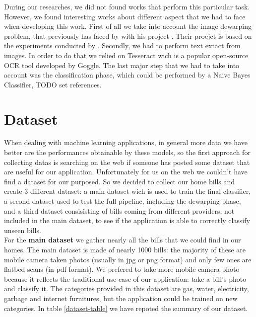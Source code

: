 \documentclass[10pt,twocolumn,letterpaper]{article}
\begin{document}
During our researches, we did not found works that perform this
particular task. However, we found interesting works about different
aspect that we had to face when developing this work.  First of all we
take into account the image dewarping problem, that previously has
faced by \cite{Improvingcamera-based} with his project
\cite{mobile-ocr}. Their proejct is based on the experiments conducted
by \cite{recoveringhomography}.  Secondly, we had to perform text
extact from images. In order to do that we relied on Tesseract
\cite{Tesseract} wich is a popular open-source OCR tool developed by
Goggle. The last major step that we had to take into account was the
classification phase, which could be performed by a Naive Bayes
Classifier, TODO set references.

\section{Dataset}
\label{sec:dataset}
When dealing with machine learning applications, in general more data we have  better are the performances obtainable by these models, so the first approach for collecting datas is searching on the web if someone has posted some dataset that are useful for our application. Unfortunately for us on the web we couldn't have find a dataset for our purposed. So we decided to collect our home bills and create 3 different dataset: a main dataset wich is used to train the final classifier, a second dataset used to test the full pipeline, including the dewarping phase, and a third dataset consisisting of bills coming from different providers, not included in the main dataset, to see if the application is able to correctly classify unseen bills.\\

For the \textbf{main dataset} we gather nearly all the bills that we could find in our homes. The main dataset is made of nearly 1000 bills: the majority of these are mobile camera taken photos (usually in jpg or png format) and only few ones are flatbed scans (in pdf format). We prefered to take more mobile camera photo because it reflects the traditional use-case of our application: take a bill's photo and classify it. The categories provided in this dataset are gas, water, electricity, garbage and internet furnitures, but the application could be trained on new categories. In table \ref{dataset-table} we have repoted the summary of our dataset.
\end{document}
